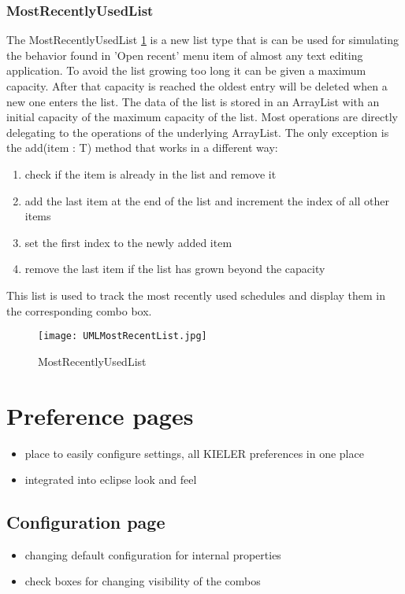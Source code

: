 \subsubsection*{MostRecentlyUsedList}
The MostRecentlyUsedList \ref{fig:MostRecentlyUsedList} is a new list type that is can be used for simulating the 
behavior found in 'Open recent' menu item of almost any text editing application.
To avoid the list growing too long it can be given a maximum capacity. After that capacity
is reached the oldest entry will be deleted when a new one enters the list.
The data of the list is stored in an ArrayList with an initial capacity of the maximum
capacity of the list. Most operations are directly delegating to the operations of the 
underlying ArrayList. 
The only exception is the add(item : T) method that works in a different way:
\begin{enumerate}
 \item check if the item is already in the list and remove it
 \item add the last item at the end of the list and increment the index of all other items
 \item set the first index to the newly added item 
 \item remove the last item if the list has grown beyond the capacity
\end{enumerate}
This list is used to track the most recently used schedules and display them
in the corresponding combo box.
\begin{figure}[MostRecentlyUsedList]
  \centering
  \texttt{[image: UMLMostRecentList.jpg]}
  \caption[MostRecentlyUsedList]%
  {MostRecentlyUsedList\protect\footnotemark}
  \label{fig:MostRecentlyUsedList}
\end{figure}

\section{Preference pages}
\begin{itemize}
 \item place to easily configure settings, all KIELER preferences in one place
 \item integrated into eclipse look and feel
\end{itemize}

\subsection{Configuration page}
\begin{itemize}
 \item changing default configuration for internal properties
 \item check boxes for changing visibility of the combos
\end{itemize}

